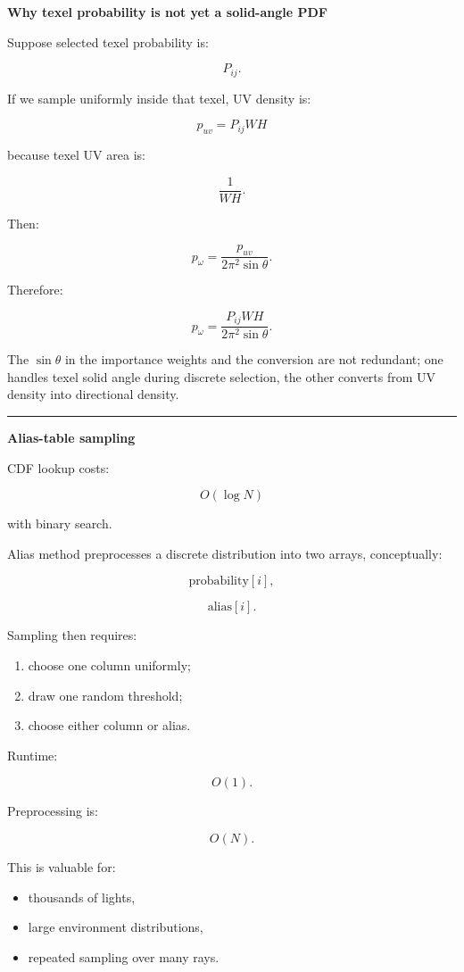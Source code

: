 \textbf{Why texel probability is not yet a solid-angle PDF}

Suppose selected texel probability is:

\[
P_{ij}.
\]

If we sample uniformly inside that texel, UV density is:

\[
p_{uv}
=
P_{ij}
WH
\]

because texel UV area is:

\[
\frac1{WH}.
\]

Then:

\[
p_\omega
=
\frac{
p_{uv}
}{
2\pi^2\sin\theta
}.
\]

Therefore:

\[
\boxed{
p_\omega
=
\frac{
P_{ij}WH
}{
2\pi^2\sin\theta
}.
}
\]

The \(\sin\theta\) in the importance weights and the conversion are not redundant; one handles texel solid angle during discrete selection, the other converts from UV density into directional density.

\begin{center}\rule{0.5\linewidth}{0.5pt}\end{center}

\textbf{Alias-table sampling}

CDF lookup costs:

\[
O(\log N)
\]

with binary search.

Alias method preprocesses a discrete distribution into two arrays, conceptually:

\[
\text{probability}[i],
\]

\[
\text{alias}[i].
\]

Sampling then requires:

\begin{enumerate}
\def\labelenumi{\arabic{enumi}.}
\tightlist
\item
  choose one column uniformly;
\item
  draw one random threshold;
\item
  choose either column or alias.
\end{enumerate}

Runtime:

\[
\boxed{O(1).}
\]

Preprocessing is:

\[
O(N).
\]

This is valuable for:

\begin{itemize}
\tightlist
\item
  thousands of lights,
\item
  large environment distributions,
\item
  repeated sampling over many rays.
\end{itemize}

